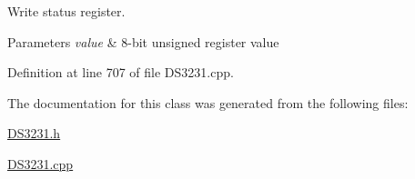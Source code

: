 Write status register. 


\begin{DoxyParams}{Parameters}
{\em value} & 8-\/bit unsigned register value \\
\hline
\end{DoxyParams}


Definition at line 707 of file D\+S3231.\+cpp.



The documentation for this class was generated from the following files\+:\begin{DoxyCompactItemize}
\item 
\hyperlink{_d_s3231_8h}{D\+S3231.\+h}\item 
\hyperlink{_d_s3231_8cpp}{D\+S3231.\+cpp}\end{DoxyCompactItemize}
